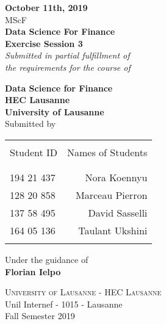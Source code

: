 \begin{titlepage}

\begin{center}

\textup{\small {\bf October 11th, 2019} \\ MScF}\\[0.2in]

\Large \textbf {Data Science For Finance \\ Exercise Session 3}\\[0.5in]

       \small \emph{Submitted in partial fulfillment of\\
        the requirements for the course of}
        \vspace{.2in}

       {\bf Data Science for Finance \\ HEC Lausanne \\ University of Lausanne}\\[0.5in]

\normalsize Submitted by \\
\begin{table}[h]
\centering
\begin{tabular}{lr}\hline \\
Student ID & Names of Students \\ \\ \hline
\\
194 21 437 & Nora Koennyu \\
128 20 858 & Marceau Pierron \\
137 58 495 & David Sasselli \\ 
164 05 136 & Taulant Ukshini \\ \\ \hline 
\end{tabular}
\end{table}

\vspace{.1in}
Under the guidance of\\
{\textbf{Florian Ielpo}}\\[0.2in]

\vfill

\normalsize
\textsc{University of Lausanne - HEC Lausanne}\\
Unil Internef - 1015 - Lausanne \\
\vspace{0.2cm}
Fall Semester 2019

\end{center}

\end{titlepage}

